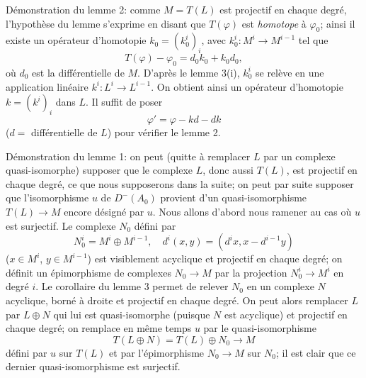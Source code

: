 Démonstration du lemme 2: comme $M=T(L)$ est projectif en chaque degré, l'hypothèse du lemme s'exprime en disant que $T(\varphi)$ est \emph{homotope} à $\varphi_0$; ainsi il existe un opérateur d'homotopie $k_0=(k_0^i)_i$, avec $k_0^i:M^i\to M^{i-1}$ tel que
\[
T(\varphi)-\varphi_0=d_0k_0+k_0d_0,
\]
où $d_0$ est la différentielle de $M$. D'après le lemme 3(i), $k_0^i$ se relève en une application linéaire $k^i:L^i\to L^{i-1}$. On obtient ainsi un opérateur d'homotopie $k=(k^i)_i$ dans $L$. Il suffit de poser
\[
\varphi'=\varphi-kd-dk
\]
($d=$ différentielle de $L$) pour vérifier le lemme 2.

Démonstration du lemme 1: on peut (quitte à remplacer $L$ par un complexe quasi-isomorphe) supposer que le complexe $L$, donc aussi $T(L)$, 
est
projectif en chaque degré, ce que nous supposerons dans la suite; on peut par suite supposer que l'isomorphisme $u$ de $D^-(A_0)$ provient d'un quasi-isomorphisme $T(L)\to M$ encore désigné par $u$. Nous allons d'abord nous ramener au cas où $u$ est surjectif. Le complexe $N_0$ défini par
\[
N_0^i=M^i\oplus M^{i-1},
\quad
 d^i(x,y)=(d^i x,x-d^{i-1}y)
\]
($x\in M^i$, $y\in M^{i-1}$) est visiblement acyclique et projectif en chaque degré; on définit un épimorphisme de complexes $N_0\to M$ par la projection $N_0^i\to M^i$ en degré $i$. Le corollaire du lemme 3 permet de relever $N_0$ en un complexe $N$ acyclique, borné à droite et projectif en chaque degré. On peut alors remplacer $L$ par $L\oplus N$ qui lui est quasi-isomorphe (puisque $N$ est acyclique) et projectif en chaque degré; on remplace en même temps $u$ par le quasi-isomorphisme
\[
T(L\oplus N)=T(L)\oplus N_0\longrightarrow M
\]
défini par $u$ sur $T(L)$ et par l'épimorphisme $N_0\to M$ sur $N_0$; il est clair que ce dernier quasi-isomorphisme est surjectif.

